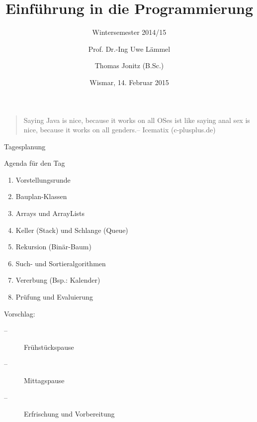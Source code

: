 \documentclass{hswbeamer}
\title[EiP]{Einführung in die Programmierung}
\subtitle[WS 2014/15]{Wintersemester 2014/15}
\author[\Copyright{Uwe L\"{a}mmel, Thomas Jonitz}]{Prof. Dr.-Ing Uwe L\"{a}mmel \and Thomas Jonitz (B.Sc.)}
\date{Wismar, 14. Februar 2015}
\begin{document}
\begin{frame}
    \begin{quote}
        \glqq Saying Java is nice, because it works on all OSes ist like saying anal sex is nice, because it works on all genders.\grqq -- Icematix (c-plusplus.de)
    \end{quote}
\end{frame}

\begin{frame}
    \maketitle
\end{frame}

\begin{frame}[shrink]{Tagesplanung}
    \begin{block}{Agenda für den Tag}
        \begin{enumerate}
        \item Vorstellungsrunde
        \item Bauplan-Klassen
        \item Arrays und ArrayLists
        \item Keller (Stack) und Schlange (Queue)
        \item Rekursion (Binär-Baum)
        \item Such- und Sortieralgorithmen
        \item Vererbung (Bsp.: Kalender)
        \item Prüfung und Evaluierung
        \end{enumerate}
    \end{block}
    \begin{block}{Vorschlag:}
        \begin{description}
        \item[--] Frühstückspause
        \item[--] Mittagspause
        \item[--] Erfrischung und Vorbereitung
        \end{description}
    \end{block}
\end{frame}
\end{document}
